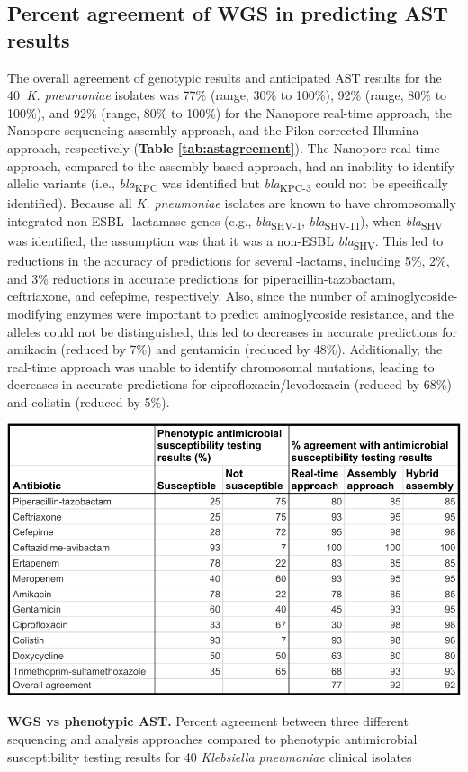 \subsection{Percent agreement of WGS in predicting AST results}
\label{sec:agree}

The overall agreement of genotypic results and anticipated AST results for the 40  \textit{K. pneumoniae} isolates was 77\% (range, 30\% to 100\%), 92\% (range, 80\% to 100\%), and 92\% (range, 80\% to 100\%) for the Nanopore real-time approach, the Nanopore sequencing assembly approach, and the Pilon-corrected Illumina approach, respectively ({\bf Table \ref{tab:astagreement}}). The Nanopore real-time approach, compared to the assembly-based approach, had an inability to identify allelic variants (i.e., \textit{bla}\textsubscript{KPC} was identified but \textit{bla}\textsubscript{KPC-3} could not be specifically identified). Because all \textit{K. pneumoniae} isolates are known to have chromosomally integrated non-ESBL {\textbeta}-lactamase genes (e.g., \textit{bla}\textsubscript{SHV-1}, \textit{bla}\textsubscript{SHV-11}), when \textit{bla}\textsubscript{SHV} was identified, the assumption was that it was a non-ESBL \textit{bla}\textsubscript{SHV}. This led to reductions in the accuracy of predictions for several {\textbeta}-lactams, including 5\%, 2\%, and 3\% reductions in accurate predictions for piperacillin-tazobactam, ceftriaxone, and cefepime, respectively. Also, since the number of aminoglycoside-modifying enzymes were important to predict aminoglycoside resistance, and the alleles could not be distinguished, this led to decreases in accurate predictions for amikacin (reduced by 7\%) and gentamicin (reduced by 48\%). Additionally, the real-time approach was unable to identify chromosomal mutations, leading to decreases in accurate predictions for ciprofloxacin/levofloxacin (reduced by 68\%) and colistin (reduced by 5\%).

\begin{table}[!ht]
\centering
\includegraphics[width = 1\linewidth,keepaspectratio]{figure/astagreement.pdf}
\caption[WGS vs phenotypic AST]{{\bf WGS vs phenotypic AST.} Percent agreement between three different sequencing and analysis approaches compared to phenotypic antimicrobial susceptibility testing results for 40 \textit{Klebsiella pneumoniae} clinical isolates }
\label{tab:astagreement}
\end{table}


